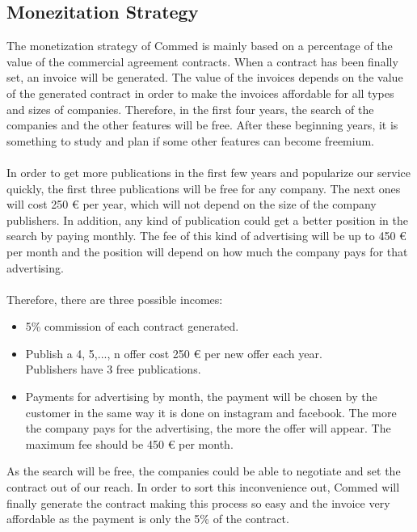 
\let\texteuro\euro
\subsection{Monezitation Strategy}
The monetization strategy of Commed is mainly based on a percentage of the value of the commercial agreement contracts. When a contract has been finally set, an invoice will be generated. The value of the invoices depends on the value of the generated contract in order to make the invoices affordable for all types and sizes of companies. Therefore, in the first four years, the search of the companies and the other features will be free. After these beginning years, it is something to study and plan if some other features can become freemium.
\\
\\
In order to get more publications in the first few years and popularize our service quickly, the first three publications will be free for any company. The next ones will cost 250 € per year, which will not depend on the size of the company publishers.
In addition, any kind of publication could get a better position in the search by paying monthly. The fee of this kind of advertising will be up to 450 € per month and the position will depend on how much the company pays for that advertising.
\\
\\
Therefore, there are three possible incomes:
\begin{itemize}
	\item 5\% commission of each contract generated.
	\item Publish a 4, 5,..., n offer cost 250 € per new offer each year. \\Publishers have 3 free publications.
	\item Payments for advertising by month, the payment will be chosen by the customer in the same way it is done on instagram and facebook. The more the company pays for the advertising, the more the offer will appear. The maximum fee should be 450 € per month.
\end{itemize}
As the search will be free, the companies could be able to negotiate and set the contract out of our reach. In order to sort this inconvenience out, Commed will finally generate the contract making this process so easy and the invoice very affordable as the payment is only the 5\% of the contract.
